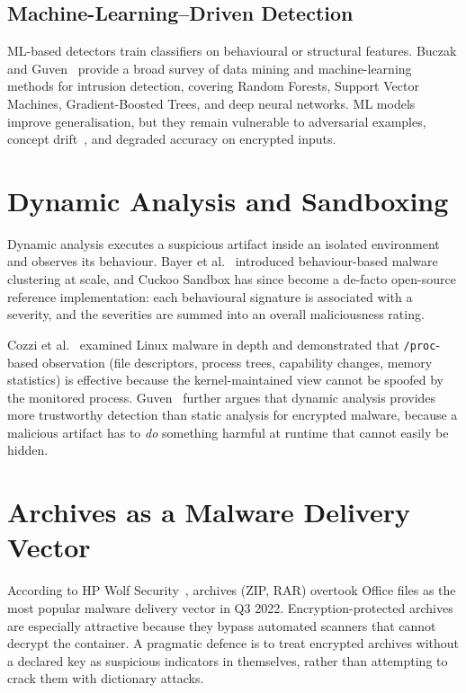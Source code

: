 \documentclass[12pt, a4paper]{report}
\begin{document}
\subsection{Machine-Learning--Driven Detection}
ML-based detectors train classifiers on behavioural or structural features.
Buczak and Guven~\cite{buczak2016survey} provide a broad survey of data
mining and machine-learning methods for intrusion detection, covering
Random Forests, Support Vector Machines, Gradient-Boosted Trees, and deep
neural networks. ML models improve generalisation, but they remain
vulnerable to adversarial examples, concept drift~\cite{widmer1996learning},
and degraded accuracy on encrypted inputs.

\section{Dynamic Analysis and Sandboxing}

Dynamic analysis executes a suspicious artifact inside an isolated
environment and observes its behaviour. Bayer et
al.~\cite{bayer2009scalable} introduced behaviour-based malware clustering
at scale, and Cuckoo Sandbox has since become a de-facto open-source
reference implementation: each behavioural signature is associated with a
severity, and the severities are summed into an overall maliciousness
rating.

Cozzi et al.~\cite{cozzi2018understanding} examined Linux malware in depth
and demonstrated that \texttt{/proc}-based observation (file descriptors,
process trees, capability changes, memory statistics) is effective because
the kernel-maintained view cannot be spoofed by the monitored process.
Guven~\cite{guven2024dynamic} further argues that dynamic analysis provides
more trustworthy detection than static analysis for encrypted malware,
because a malicious artifact has to \emph{do} something harmful at runtime
that cannot easily be hidden.

\section{Archives as a Malware Delivery Vector}

According to HP Wolf Security~\cite{hpwolf2022archive}, archives
(ZIP, RAR) overtook Office files as the most popular malware delivery
vector in Q3 2022. Encryption-protected archives are especially attractive
because they bypass automated scanners that cannot decrypt the container.
A pragmatic defence is to treat encrypted archives without a declared key
as suspicious indicators in themselves, rather than attempting to crack
them with dictionary attacks.
\end{document}

